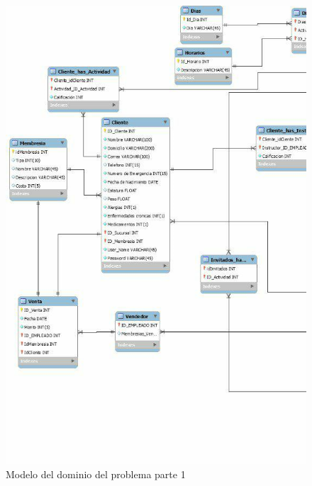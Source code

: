 \begin{figure}[htbp!]
	\begin{center}
		\includegraphics[angle=90,width=.95\textwidth]{images/modeloDelDominioDelProblema2}
		\caption{Modelo del dominio del problema parte 1}
		\label{fig:modeloDeDominio}
	\end{center}
\end{figure}


